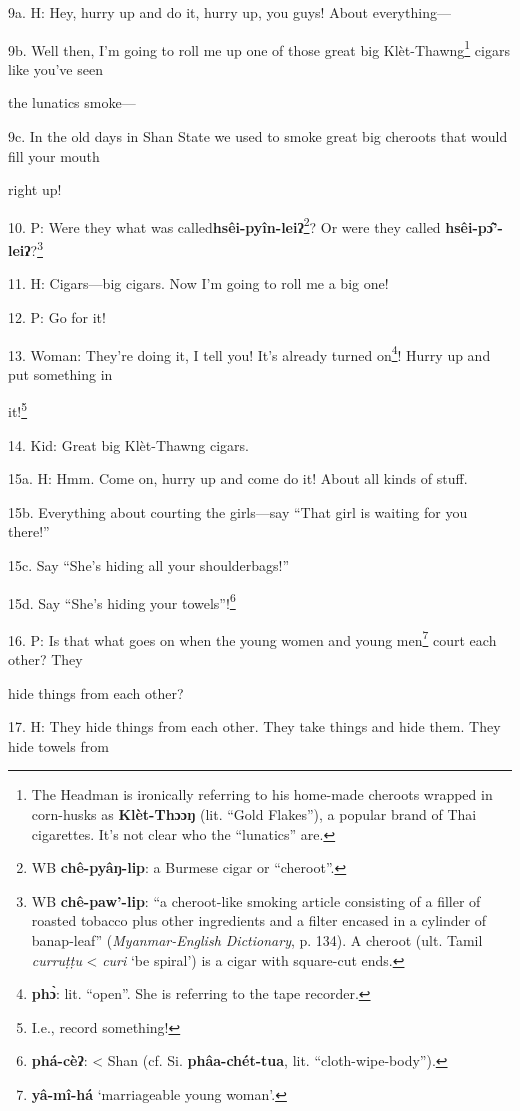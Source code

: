 9a. H: Hey, hurry up and do it, hurry up, you guys! About everything---

9b. Well then, I'm going to roll me up one of those great big Klèt-Thawng\footnote{The Headman is ironically referring to his home-made cheroots wrapped in corn-husks as \textbf{Klèt-Thɔɔŋ} (lit. ``Gold Flakes''), a popular brand of Thai cigarettes. It's not clear who the ``lunatics'' are.}
cigars like you've seen

the lunatics smoke---

9c. In the old days in Shan State we used to smoke great big cheroots that would
fill your mouth

right up!

10. P: Were they what was called\textbf{hsêi-pyîn-leiʔ}\footnote{WB \textbf{chê-pyâŋ-lip}: a Burmese cigar or ``cheroot''.}? Or were they
called \textbf{hsêi-pɔ̂'-leiʔ}?\footnote{WB \textbf{chê-paw'-lip}: ``a cheroot-like smoking article consisting of a filler of roasted tobacco plus other ingredients and a filter encased in a cylinder of banap-leaf'' (\textit{Myanmar-English Dictionary}, p. 134). A cheroot (ult. Tamil \textit{curruṭṭu} < \textit{curi} `be spiral') is a cigar with square-cut ends.}

11. H: Cigars---big cigars. Now I'm going to roll me a big one!

12. P: Go for it!

13. Woman: They're doing it, I tell you! It's already turned on\footnote{\textbf{phɔ̀}: lit. ``open''. She is referring to the tape recorder.}! Hurry up
and put something in

it!\footnote{I.e., record something!}

14. Kid: Great big Klèt-Thawng cigars.

15a. H: Hmm. Come on, hurry up and come do it! About all kinds of stuff.

15b. Everything about courting the girls---say ``That girl is waiting for you there!''

15c. Say ``She's hiding all your shoulderbags!''

15d. Say ``She's hiding your towels''!\footnote{\textbf{phá-cèʔ}: < Shan (cf. Si. \textbf{phâa-chét-tua}, lit. ``cloth-wipe-body'').}

16. P: Is that what goes on when the young women and young men\footnote{\textbf{yâ-mî-há} `marriageable young woman'.} court each
other? They

hide things from each other?

17. H: They hide things from each other. They take things and hide them. They hide
towels from

